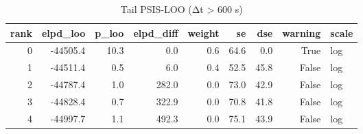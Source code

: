 \begin{table}
\caption{Tail PSIS-LOO (Δt > 600 s)}
\label{tab:tailPSISI600s}
\begin{tabular}{rrrrrrrrl}
\toprule
rank & elpd_loo & p_loo & elpd_diff & weight & se & dse & warning & scale \\
\midrule
0 & -44505.4 & 10.3 & 0.0 & 0.6 & 64.6 & 0.0 & True & log \\
1 & -44511.4 & 0.5 & 6.0 & 0.4 & 52.5 & 45.8 & False & log \\
2 & -44787.4 & 1.0 & 282.0 & 0.0 & 73.0 & 42.9 & False & log \\
3 & -44828.4 & 0.7 & 322.9 & 0.0 & 70.8 & 41.8 & False & log \\
4 & -44997.7 & 1.1 & 492.3 & 0.0 & 75.1 & 43.9 & False & log \\
\bottomrule
\end{tabular}
\end{table}

